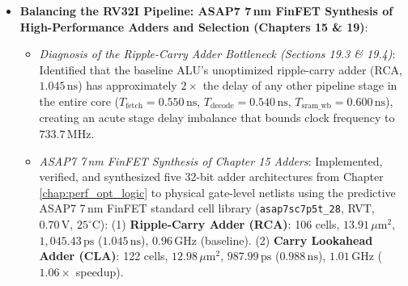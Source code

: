 \begin{itemize}
\begin{itemize}
        (4) \textbf{Wallace Tree Multiplier}: 7,293 cells, $627.77\,\mu\text{m}^2$, $2,088.55\,\text{ps}$ ($2.089\,\text{ns}$), $0.479\,\text{GHz}$ ($-42.0\%$ area, $1.03\times$).
        (5) \textbf{Redundant Binary Multiplier (RBM)}: 14,920 cells, $1,072.65\,\mu\text{m}^2$, $2,245.91\,\text{ps}$ ($2.246\,\text{ns}$), $0.445\,\text{GHz}$ ($-1.0\%$ area, $0.96\times$).
        \item \textit{Multiplier Selection, Chisel Integration, and Pipeline Balancing (Section 19.5)}: Selected the Radix-4 Booth Multiplier as the primary area-optimized multiplier for standard-cell cores (while noting RBM for regular custom DSP datapaths). Provided concise Chisel code showing only the multiplier invocation. Demonstrated how internally pipelining the multiplier into 4 balanced stages of $\approx 0.50\text{--}0.54\,\text{ns}$ resolves the Zmmul frequency collapse, enabling the processor to operate at the full \textbf{1.67\,GHz} clock frequency ($2.27\times$ over the unoptimized baseline) while delivering single-cycle multiplier throughput.
    \end{itemize}
    \item \textbf{Balancing the RV32I Pipeline: ASAP7 7\,nm FinFET Synthesis of High-Performance Adders and Selection (Chapters 15 \& 19)}:
    \begin{itemize}
        \item \textit{Diagnosis of the Ripple-Carry Adder Bottleneck (Sections 19.3 \& 19.4)}: Identified that the baseline ALU's unoptimized ripple-carry adder (RCA, $1.045\,\text{ns}$) has approximately $2\times$ the delay of any other pipeline stage in the entire core ($T_{\text{fetch}} = 0.550\,\text{ns}$, $T_{\text{decode}} = 0.540\,\text{ns}$, $T_{\text{sram\_wb}} = 0.600\,\text{ns}$), creating an acute stage delay imbalance that bounds clock frequency to $733.7\,\text{MHz}$.
        \item \textit{ASAP7 7\,nm FinFET Synthesis of Chapter 15 Adders}: Implemented, verified, and synthesized five 32-bit adder architectures from Chapter \ref{chap:perf_opt_logic} to physical gate-level netlists using the predictive ASAP7 7\,nm FinFET standard cell library (\texttt{asap7sc7p5t\_28}, RVT, $0.70\,\text{V}$, $25^\circ\text{C}$):
        (1) \textbf{Ripple-Carry Adder (RCA)}: 106 cells, $13.91\,\mu\text{m}^2$, $1,045.43\,\text{ps}$ ($1.045\,\text{ns}$), $0.96\,\text{GHz}$ (baseline).
        (2) \textbf{Carry Lookahead Adder (CLA)}: 122 cells, $12.98\,\mu\text{m}^2$, $987.99\,\text{ps}$ ($0.988\,\text{ns}$), $1.01\,\text{GHz}$ ($1.06\times$ speedup).

\end{itemize}
\end{itemize}
